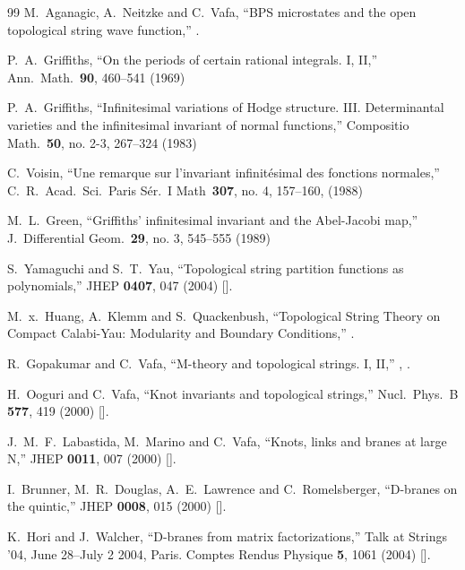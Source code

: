\begin{thebibliography}{99}
M.~Aganagic, A.~Neitzke and C.~Vafa,
``BPS microstates and the open topological string wave function,''
.

P.~A.~Griffiths, 
``On the periods of certain rational integrals. I, II,''
Ann.~Math.~{\bf 90}, 460--541 (1969)

P.~A.~Griffiths, 
``Infinitesimal variations of Hodge structure. III. 
Determinantal varieties and the infinitesimal invariant of normal functions,''
Compositio Math.\ {\bf 50},  no. 2-3, 267--324 (1983)

C.~Voisin,
``Une remarque sur l'invariant infinit\'esimal des fonctions normales,''
C.\ R.\ Acad.\ Sci.\ Paris Sér.~I Math~{\bf 307}, no. 4, 157--160, (1988)

M.~L.~Green,
``Griffiths' infinitesimal invariant and the Abel-Jacobi map,''
J.~Differential Geom.\ {\bf 29}, no. 3, 545--555 (1989) 

 S.~Yamaguchi and S.~T.~Yau,
  ``Topological string partition functions as polynomials,''
  JHEP {\bf 0407}, 047 (2004)
  [].


 M.~x.~Huang, A.~Klemm and S.~Quackenbush,
  ``Topological String Theory on Compact Calabi-Yau: Modularity and Boundary
  Conditions,''
  .

  R.~Gopakumar and C.~Vafa, 
  ``M-theory and topological strings. I, II,''
 , .

 H.~Ooguri and C.~Vafa,
  ``Knot invariants and topological strings,''
  Nucl.\ Phys.\  B {\bf 577}, 419 (2000)
  [].

  J.~M.~F.~Labastida, M.~Marino and C.~Vafa,
  ``Knots, links and branes at large N,''
  JHEP {\bf 0011}, 007 (2000)
  [].

I.~Brunner, M.~R.~Douglas, A.~E.~Lawrence and C.~Romelsberger,
``D-branes on the quintic,''
JHEP {\bf 0008}, 015 (2000)
[].

K.~Hori and J.~Walcher,
``D-branes from matrix factorizations,''
Talk at Strings '04, June 28--July 2 2004, Paris.
Comptes Rendus Physique {\bf 5}, 1061 (2004)
[].


\end{thebibliography}
